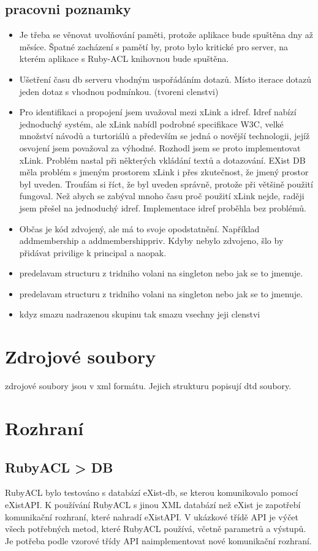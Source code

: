 \documentclass[11pt,twoside,a4paper]{book}
\begin{document}
\subsection{pracovni poznamky}
\begin{itemize}
\item Je třeba se věnovat uvolňování paměti, protože aplikace bude spuštěna dny až měsíce. Špatné zacházení s pamětí by, proto bylo kritické pro server, na kterém aplikace s Ruby-ACL knihovnou bude spuštěna.
\item Ušetření času db serveru vhodným uspořádáním dotazů. Místo iterace dotazů jeden dotaz s vhodnou podmínkou. (tvoreni clenstvi) 
\item Pro identifikaci a propojení jsem uvažoval mezi xLink a idref. Idref nabízí jednoduchý systém, ale xLink nabídl podrobné specifikace W3C, velké množství návodů a turtoriálů a především se jedná o novější technologii, jejíž osvojení jsem považoval za výhodné. Rozhodl jsem se proto implementovat xLink. Problém nastal při některých vkládání textů a dotazování. EXist DB měla problém s jmeným prostorem xLink i přes zkutečnost, že jmený prostor byl uveden. Troufám si říct, že byl uveden správně, protože při většině použití fungoval. Než abych se zabýval mnoho času proč použití xLink nejde, raději jsem přešel na jednoduchý idref. Implementace idref proběhla bez problémů.
\item Občas je kód zdvojený, ale má to svoje opodstatnění. Například addmembership a addmembershippriv. Kdyby nebylo zdvojeno, šlo by přidávat privilige k principal a naopak.
\item predelavam structuru z tridniho volani na singleton nebo jak se to jmenuje.\item predelavam structuru z tridniho volani na singleton nebo jak se to jmenuje.
\item kdyz smazu nadrazenou skupinu tak smazu vsechny jeji clenstvi
\end{itemize}

\section{Zdrojové soubory}
zdrojové soubory jsou v xml formátu. Jejich strukturu popisují dtd soubory.

\section{Rozhraní}

\subsection{RubyACL > DB}
RubyACL bylo testováno s databází eXist-db, se kterou komunikovalo pomocí eXistAPI. 
K používání RubyACL s jinou XML databází než eXist je zapotřebí komunikační rozhraní, které nahradí eXistAPI. 
V ukázkové třídě API je výčet všech potřebných metod, které RubyACL používá, včetně parametrů a výstupů. Je potřeba podle vzorové třídy API naimplementovat nové komunikační rozhraní. 
\end{document}
